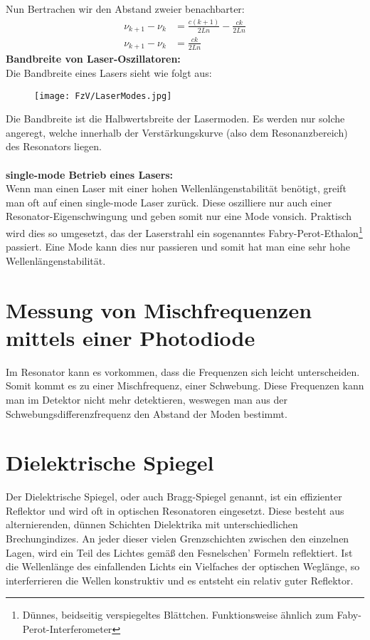 Nun Bertrachen wir den Abstand zweier benachbarter:
\begin{align}
    \nu_{k+1}-\nu_k&=\frac{c(k+1)}{2Ln}-\frac{ck}{2Ln}\\
    \nu_{k+1}-\nu_k&=\frac{ck}{2Ln}
\end{align}
\textbf{Bandbreite von Laser-Oszillatoren:}\\
Die Bandbreite eines Lasers sieht wie folgt aus:
\begin{center}
    \begin{figure}[h]
        \texttt{[image: FzV/LaserModes.jpg]}
    \end{figure}
\end{center}
Die Bandbreite ist die Halbwertsbreite der Lasermoden.
Es werden nur solche angeregt, welche innerhalb der Verstärkungskurve (also dem Resonanzbereich) des Resonators liegen.\\\\
\textbf{single-mode Betrieb eines Lasers:}\\
Wenn man einen Laser mit einer hohen Wellenlängenstabilität benötigt, greift man oft auf einen single-mode Laser zurück.
Diese oszilliere nur auch einer Resonator-Eigenschwingung und geben somit nur eine Mode vonsich.
Praktisch wird dies so umgesetzt, das der Laserstrahl ein sogenanntes Fabry-Perot-Ethalon\footnote{Dünnes, beidseitig verspiegeltes Blättchen. Funktionsweise ähnlich zum Faby-Perot-Interferometer} passiert.
Eine Mode kann dies nur passieren und somit hat man eine sehr hohe Wellenlängenstabilität.
\section{Messung von Mischfrequenzen mittels einer Photodiode}
Im Resonator kann es vorkommen, dass die Frequenzen sich leicht unterscheiden.
Somit kommt es zu einer Mischfrequenz, einer Schwebung.
Diese Frequenzen kann man im Detektor nicht mehr detektieren, weswegen man aus der Schwebungsdifferenzfrequenz den Abstand der Moden bestimmt.
\section{Dielektrische Spiegel}
Der Dielektrische Spiegel, oder auch Bragg-Spiegel genannt, ist ein effizienter Reflektor und wird oft in optischen Resonatoren eingesetzt.
Diese besteht aus alternierenden, dünnen Schichten Dielektrika mit unterschiedlichen Brechungindizes.
An jeder dieser vielen Grenzschichten zwischen den einzelnen Lagen, wird ein Teil des Lichtes gemäß den Fesnelschen' Formeln reflektiert.
Ist die Wellenlänge des einfallenden Lichts ein Vielfaches der optischen Weglänge, so interferrieren die Wellen konstruktiv und es entsteht ein relativ guter Reflektor.
